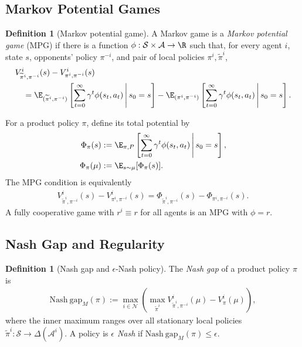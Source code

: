 \documentclass{article}
\theoremstyle{plain}
\theoremstyle{definition}
\newtheorem{definition}[theorem]{Definition}
\theoremstyle{remark}
\newcommand{\Nash}{\mathrm{Nash\ gap}}
\newcommand{\N}{\mathcal{N}}
\newcommand{\St}{\mathcal{S}}
\newcommand{\Ac}{\mathcal{A}}
\begin{document}
\subsection{Markov Potential Games}

\begin{definition}[Markov potential game]
\label{def:mpg}
A Markov game is a \emph{Markov potential game} (MPG) if there is a function
$\phi:\St\times\Ac\to\R$ such that, for every agent $i$, state $s$,
opponents' policy $\pi^{-i}$, and pair of local policies
$\pi^i,\widetilde\pi^i$,
\begin{align*}
  &V^i_{\widetilde\pi^i,\pi^{-i}}(s)
  -V^i_{\pi^i,\pi^{-i}}(s)\\
  &\quad=
  \E_{(\widetilde\pi^i,\pi^{-i})}\left[
    \sum_{t=0}^{\infty}\gamma^t\phi(s_t,a_t)
    \,\middle|\,s_0=s
  \right]
  -
  \E_{(\pi^i,\pi^{-i})}\left[
    \sum_{t=0}^{\infty}\gamma^t\phi(s_t,a_t)
    \,\middle|\,s_0=s
  \right].
\end{align*}
\end{definition}

For a product policy $\pi$, define its total potential by
\begin{align*}
  \Phi_\pi(s)
  &:=
  \E_{\pi,P}\left[
    \sum_{t=0}^{\infty}\gamma^t\phi(s_t,a_t)
    \,\middle|\,s_0=s
  \right],\\
  \Phi_\pi(\mu)
  &:=
  \E_{s\sim\mu}[\Phi_\pi(s)].
\end{align*}
The MPG condition is equivalently
\begin{align*}
  V^i_{\widetilde\pi^i,\pi^{-i}}(s)
  -V^i_{\pi^i,\pi^{-i}}(s)
  =
  \Phi_{\widetilde\pi^i,\pi^{-i}}(s)
  -\Phi_{\pi^i,\pi^{-i}}(s).
\end{align*}
A fully cooperative game with $r^i\equiv r$ for all agents is an MPG with
$\phi=r$.

\subsection{Nash Gap and Regularity}

\begin{definition}[Nash gap and $\epsilon$-Nash policy]
\label{def:nash}
The \emph{Nash gap} of a product policy $\pi$ is
\begin{align*}
  \Nash_M(\pi)
  :=
  \max_{i\in\N}
  \left(
    \max_{\widetilde\pi^i}
    V^i_{\widetilde\pi^i,\pi^{-i}}(\mu)
    -V^i_\pi(\mu)
  \right),
\end{align*}
where the inner maximum ranges over all stationary local policies
$\widetilde\pi^i:\St\to\Delta(\Ac^i)$. A policy is \emph{$\epsilon$ Nash} if
$\Nash_M(\pi)\le\epsilon$.
\end{definition}
\end{document}
